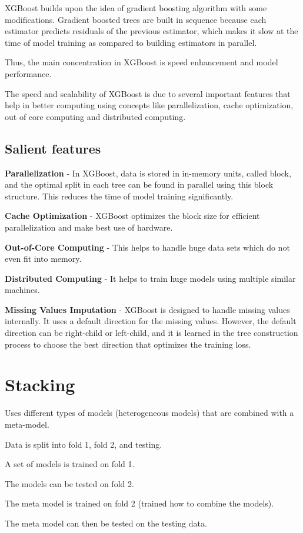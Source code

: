	\begin{bulletedlist}
		\item XGBoost builds upon the idea of gradient boosting algorithm with some modifications. Gradient boosted trees are built in sequence because each estimator predicts residuals of the previous estimator, which makes it slow at the time of model training as compared to building estimators in parallel.
		\item Thus, the main concentration in XGBoost is speed enhancement and model performance.
		\item The speed and scalability of XGBoost is due to several important features that help in better computing using concepts like parallelization, cache optimization, out of core computing and
distributed computing.
	\end{bulletedlist}

	\subsection{Salient features}
	\begin{bulletedlist}
		\item \textbf{Parallelization} - In XGBoost, data is stored in in-memory units, called block, and the optimal split in each tree can be found in parallel using this block structure.  This reduces the time of model training significantly.
		\item \textbf{Cache Optimization} - XGBoost optimizes the block size for efficient parallelization and make best use of hardware.
		\item \textbf{Out-of-Core Computing} - This helps to handle huge data sets which do not even fit into memory.
		\item \textbf{Distributed Computing} - It helps to train huge models using multiple similar machines.
		\item \textbf{Missing Values Imputation} - XGBoost is designed to handle missing values internally.  It uses a default direction for the missing values. However, the default
direction can be right-child or left-child, and it is learned in the tree construction process to choose the best direction that optimizes the training loss.
	\end{bulletedlist}

	\section{Stacking}
Uses different types of models (heterogeneous models) that are combined with a meta-model.

	\begin{numberedlist}
		\item Data is split into fold 1, fold 2, and testing.
		\item A set of models is trained on fold 1.
		\item The models can be tested on fold 2.
		\item The meta model is trained on fold 2 (trained how to combine the models).
		\item The meta model can then be tested on the testing data.
	\end{numberedlist} 